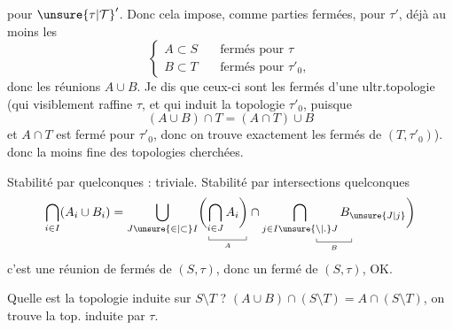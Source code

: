 pour $ {\unsure{\tau|\mathcal T}}'$. Donc cela impose, comme parties fermées, pour $\tau'$, déjà au moins les
\[
\left\{\begin{aligned}
 A\subset S&\quad\text{fermés pour }\tau\\
 B\subset T&\quad\text{fermés pour }\tau'_0,
\end{aligned}\right.
\]
donc les réunions $A\cup B$. Je dis que ceux-ci sont  les fermés d'une ultr.topologie (qui visiblement raffine $\tau$, et qui induit la topologie $\tau'_0$, puisque
\[
 (A\cup B)\cap T=(A\cap T)\cup B
\]
et $A\cap T$ est fermé pour $\tau'_0$, donc on trouve exactement les fermés de $(T,\tau'_0)$).
 donc la  moins fine des topologies cherchées.

 Stabilité par  quelconques : triviale. Stabilité par intersections quelconques
\[
 \bigcap_{i\in I}(A_i\cup B_i)=
 \bigcup_{J\unsure{\in|\subset} I}
 \biggl(\underset{\underset{A}{\rule{.35pt}{.3em}\rule{3em}{.35pt}\rule{.35pt}{.3em}}}{\bigcap_{i\in J}A_i\biggr)}
 \cap\underset{\underset{B}{\rule{.35pt}{.3em}\rule{2.8em}{.35pt}\rule{.35pt}{.3em}}}{\bigcap_{j\in I\unsure{\setminus|\mathord{.}} J} B_{\unsure{J|j}}}\biggr)
\]
c'est une réunion de fermés de $(S,\tau)$, donc un fermé de $(S,\tau)$, OK.

Quelle est la topologie induite  sur $S\setminus T$ ? $(A\cup B)\cap(S\setminus T)=A\cap(S\setminus T)$, on trouve la top. induite par $\tau$.

